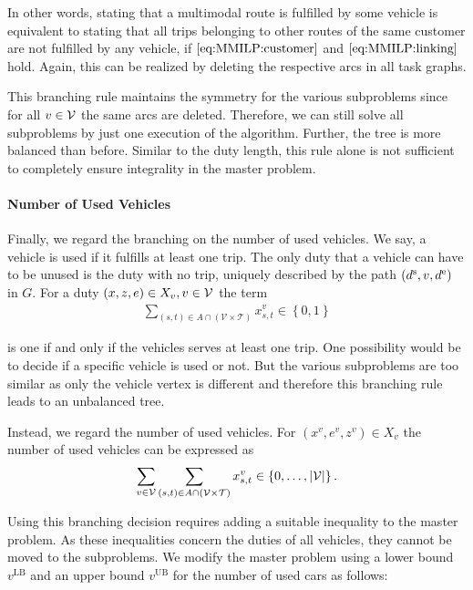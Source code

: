 In other words, stating that a multimodal route is fulfilled by some vehicle is equivalent to stating that all trips belonging to other routes of the same customer are not fulfilled by any vehicle, if $\eqref{eq:MMILP:customer}$ and $\eqref{eq:MMILP:linking}$ hold. Again, this can be realized by deleting the respective arcs in all task graphs.

This branching rule maintains the symmetry for the various subproblems since for all $v\in\mathcal{V}$ the same arcs are deleted. Therefore, we can still solve all subproblems by just one execution of the algorithm. Further, the tree is more balanced than before. Similar to the duty length, this rule alone is not sufficient to completely ensure integrality in the master problem.

\paragraph{Number of Used Vehicles} \parfill

Finally, we regard the branching on the number of used vehicles. We say, a vehicle is used if it fulfills at least one trip. The only duty that a vehicle can have to be unused is the duty with no trip, uniquely described by the path ${\left(d^{\operatorname{s}},v,d^{\operatorname{e}}\right)}$ in $G$. For a duty $(x,z,e)\in X_v, v\in\mathcal{V}$ the term
\begin{align*}
	\sum_{(s,t)\in A\cap\left(\mathcal{V}\times\mathcal{T}\right)} x^v_{s,t}\in\left\{0,1\right\}
\end{align*}

is one if and only if the vehicles serves at least one trip. One possibility would be to decide if a specific vehicle is used or not. But the various subproblems are too similar as only the vehicle vertex is different and therefore this branching rule leads to an unbalanced tree.

Instead, we regard the number of used vehicles. For ${\left(x^v,e^v,z^v\right)\in X_v}$ the number of used vehicles can be expressed as
\begin{align*}
	\sum_{v\in\mathcal{V}}\sum_{(s,t)\in A\cap\left(\mathcal{V}\times\mathcal{T}\right)} x^v_{s,t}\in\left\{0,\dots,\vert\mathcal{V}\vert\right\}.
\end{align*}

Using this branching decision requires adding a suitable inequality to the master problem. As these inequalities concern the duties of all vehicles, they cannot be moved to the subproblems. We modify the master problem using a lower bound $v^{\operatorname{LB}}$ and an upper bound $v^{\operatorname{UB}}$ for the number of used cars as follows:

